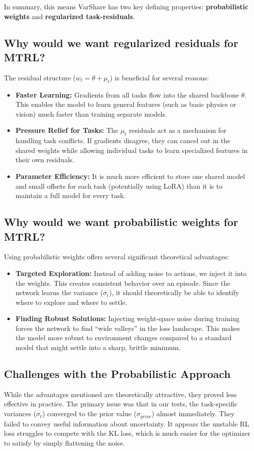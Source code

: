 \documentclass[11pt,a4paper]{article}
\begin{document}
In summary, this means VarShare has two key defining properties: \textbf{probabilistic weights} and \textbf{regularized task-residuals}.

\subsection{Why would we want regularized residuals for MTRL?}
The residual structure ($w_t = \theta + \mu_t$) is beneficial for several reasons:
\begin{itemize}
    \item \textbf{Faster Learning:} Gradients from all tasks flow into the shared backbone $\theta$. This enables the model to learn general features (such as basic physics or vision) much faster than training separate models.
    \item \textbf{Pressure Relief for Tasks:} The $\mu_t$ residuals act as a mechanism for handling task conflicts. If gradients disagree, they can cancel out in the shared weights while allowing individual tasks to learn specialized features in their own residuals. 
    \item \textbf{Parameter Efficiency:} It is much more efficient to store one shared model and small offsets for each task (potentially using LoRA) than it is to maintain a full model for every task.
\end{itemize}

\subsection{Why would we want probabilistic weights for MTRL?}
Using probabilistic weights offers several significant theoretical advantages:
\begin{itemize}
    \item \textbf{Targeted Exploration:} Instead of adding noise to actions, we inject it into the weights. This creates consistent behavior over an episode. Since the network learns the variance ($\sigma_t$), it should theoretically be able to identify where to explore and where to settle.
    \item \textbf{Finding Robust Solutions:} Injecting weight-space noise during training forces the network to find ``wide valleys'' in the loss landscape. This makes the model more robust to environment changes compared to a standard model that might settle into a sharp, brittle minimum.
\end{itemize}

\subsection{Challenges with the Probabilistic Approach}
While the advantages mentioned are theoretically attractive, they proved less effective in practice. The primary issue was that in our tests, the task-specific variances ($\sigma_t$) converged to the prior value ($\sigma_{prior}$) almost immediately. They failed to convey useful information about uncertainty. It appears the unstable RL loss struggles to compete with the KL loss, which is much easier for the optimizer to satisfy by simply flattening the noise.
\end{document}
